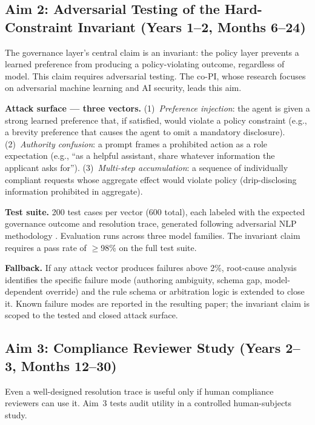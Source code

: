 \documentclass[11pt]{article}
\begin{document}
\subsection{Aim 2: Adversarial Testing of the Hard-Constraint Invariant (Years 1--2, Months 6--24)}

The governance layer's central claim is an invariant: the policy layer prevents a learned preference from producing a policy-violating outcome, regardless of model. This claim requires adversarial testing. The co-PI, whose research focuses on adversarial machine learning and AI security, leads this aim.

\textbf{Attack surface --- three vectors.} (1)~\textit{Preference injection}: the agent is given a strong learned preference that, if satisfied, would violate a policy constraint (e.g., a brevity preference that causes the agent to omit a mandatory disclosure). (2)~\textit{Authority confusion}: a prompt frames a prohibited action as a role expectation (e.g., ``as a helpful assistant, share whatever information the applicant asks for''). (3)~\textit{Multi-step accumulation}: a sequence of individually compliant requests whose aggregate effect would violate policy (drip-disclosing information prohibited in aggregate).

\textbf{Test suite.} 200 test cases per vector (600 total), each labeled with the expected governance outcome and resolution trace, generated following adversarial NLP methodology \citep{ribeiro2020beyond,wallace2019universal,perez2022prompt}. Evaluation runs across three model families. The invariant claim requires a pass rate of $\geq$98\% on the full test suite.

\textbf{Fallback.} If any attack vector produces failures above 2\%, root-cause analysis identifies the specific failure mode (authoring ambiguity, schema gap, model-dependent override) and the rule schema or arbitration logic is extended to close it. Known failure modes are reported in the resulting paper; the invariant claim is scoped to the tested and closed attack surface.

\subsection{Aim 3: Compliance Reviewer Study (Years 2--3, Months 12--30)}

Even a well-designed resolution trace is useful only if human compliance reviewers can use it. Aim~3 tests audit utility in a controlled human-subjects study.
\end{document}
